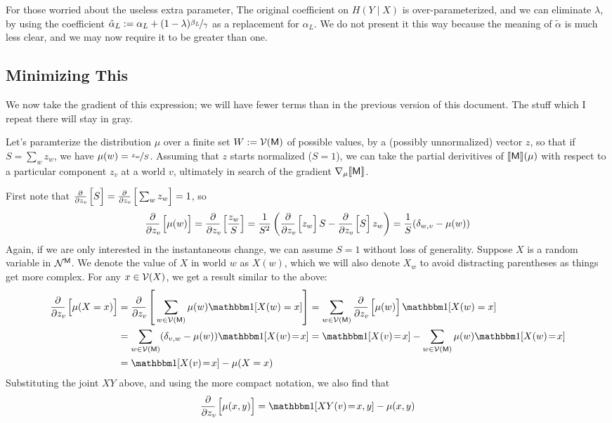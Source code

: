 \documentclass{article}
\newcommand{\sfM}{\mathsf M}
\begin{document}
	For those worried about the useless extra parameter, 
	The original coefficient on $H(Y \mid X)$ is over-parameterized, and we can eliminate $\lambda$, by using the coefficient $\tilde \alpha_L := \alpha_L + (1-\lambda) \nicefrac{\beta_L}{\gamma}$ as a replacement for $\alpha_L$. We do not present it this way because the meaning of $\tilde \alpha$ is much less clear, and we may now require it to be greater than one.

	
	\subsection{Minimizing This}
	We now take the gradient of this expression; we will have fewer terms than in the previous version of this document. The stuff which I repeat there will stay in gray.
	
	\def\pz#1{\frac{\partial}{\partial z_v\!}\left[\vphantom{\Big|}#1\right]}
	\begingroup\color{gray!50!black}
	Let's paramterize the distribution $\mu$ over a finite set $W := \V(\sfM)$ of possible values, by a (possibly unnormalized) vector $z$, so that if $S = \sum_{w} z_w$, we have $\mu(w) = \nicefrac{z_w}{S}$. Assuming that $z$ starts normalized ($S = 1$), we can take the partial derivitives of $\bbr{\sfM}(\mu)$ with respect to a particular component $z_v$ at a world $v$, ultimately in search of the gradient $\nabla_{\mu} \bbr{\sfM}$.
		
	First note that $\pz{S} = \pz{\sum_w z_w} = 1$, so
	\[ \pz{\mu(w)} = \pz{\frac{z_w}{S}} 
		= \frac{1}{S^2} \left(\pz{z_w} {S} - \pz{S}z_w \right) 
		= \frac{1}{S}(\delta_{w,v} - \mu(w))
	\]
	Again, if we are only interested in the instantaneous change, we can assume $S = 1$ without loss of generality.
	Suppose $X$ is a random variable in $\N^\sfM$. We denote the value of $X$ in world $w$ as $X(w)$, which we will also denote $X_w$ to avoid distracting parentheses as things get more complex. For any $x \in \mathcal V(X)$, we get a result similar to the above:
	\begin{align*} \pz{\mu(X = x)}
	  	&= \pz{\sum_{w \in \V(\sfM)} \mu(w) \mathbbm1[X(w) = x]}
	 	= \sum_{w \in \V(\sfM)} \pz{\mu(w)} \mathbbm1[X(w) = x] \\
	 	&= \sum_{w \in \V(\sfM)} (\delta_{v,w} - \mu(w)) \mathbbm1[X(w) \!=\! x]
	 	= \mathbbm1[X(v) \!=\! x] - \sum_{w \in \V(\sfM)} \mu(w) \mathbbm1[X(w) \!=\! x] \\
	 	&=  \mathbbm1[X(v) \!=\! x]  - \mu(X = x)
	\end{align*}
	Substituting the joint $XY$ above, and using the more compact notation, we also find that
	\[ \pz{\mu(x,y)} = \mathbbm1[XY(v) \!=\! x,y] - \mu(x,y) \] 
	
\end{document}
